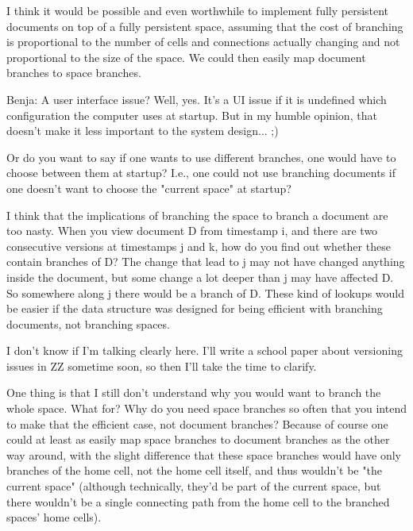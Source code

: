 \documentclass[a4paper]{article}
\begin{document}
\begin{itemize}
             I think it would be possible and even worthwhile to
             implement fully persistent documents on top of a fully
             persistent space, assuming that the cost of branching is
             proportional to the number of cells and connections
             actually changing and not proportional to the size of the
             space.  We could then easily map document branches to
             space branches.
                
                Benja: A user interface issue? Well, yes. It's a UI issue if it
                is undefined which configuration the computer uses at startup. 
                But in my humble opinion, that doesn't make it less important 
                to the system design... ;)
                
                Or do you want to say if one wants to use different branches,
                one would have to choose between them at startup? I.e., one
                could not use branching documents if one doesn't want to
                choose the "current space" at startup?
                
                I think that the implications of branching the space to branch
                a document are too nasty. When you view document D from
                timestamp i, and there are two consecutive versions at
                timestamps j and k, how do you find out whether these contain
                branches of D? The change that lead to j may not have changed
                anything inside the document, but some change a lot deeper than
                j may have affected D. So somewhere along j there would be a
                branch of D. These kind of lookups would be easier if the
                data structure was designed for being efficient with
                branching documents, not branching spaces.
                
                I don't know if I'm talking clearly here. I'll write a school
                paper about versioning issues in ZZ sometime soon, so then
                I'll take the time to clarify.
                
                One thing is that I still don't understand why you would want
                to branch the whole space. What for? Why do you need space
                branches so often that you intend to make that the efficient
                case, not document branches? Because of course one could at
                least as easily map space branches to document branches as
                the other way around, with the slight difference that these
                space branches would have only branches of the home cell, not
                the home cell itself, and thus wouldn't be "the current space"
                (although technically, they'd be part of the current space,
                but there wouldn't be a single connecting path from the
                home cell to the branched spaces' home cells).
                

\end{itemize}
\end{document}
